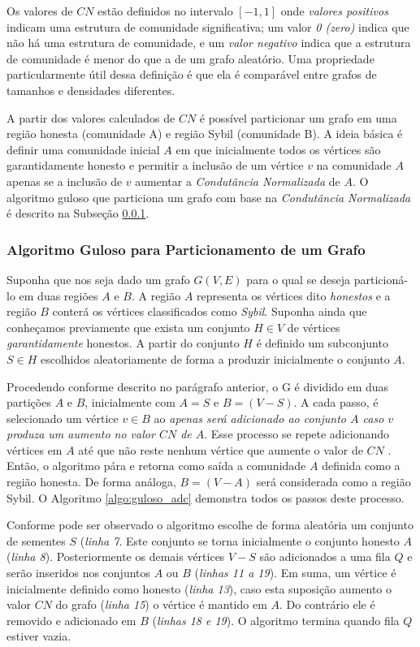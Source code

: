 \documentclass[12pt]{article}
\begin{document}
Os valores de $CN$ estão definidos no intervalo $[-1,1]$ onde \textit{valores positivos} indicam uma estrutura de comunidade significativa; um valor \textit{0 (zero)} indica que não há uma estrutura de comunidade, e um \textit{valor negativo} indica que a estrutura de comunidade é menor do que a de um
grafo aleatório. Uma propriedade particularmente útil dessa definição é que ela é comparável entre grafos de tamanhos e densidades diferentes.

A partir dos valores calculados de $CN$ é possível particionar um grafo em uma região honesta (comunidade A) e região Sybil (comunidade B). A ideia básica é definir uma comunidade inicial $A$ em que inicialmente todos os vértices são garantidamente honesto e permitir a inclusão de um vértice $v$ na comunidade $A$ apenas se a inclusão de $v$ aumentar a \textit{Condutância Normalizada} de $A$.  O algoritmo guloso que particiona um grafo com base na \textit{Condutância Normalizada} é descrito na Subseção \ref{subsubsec:algoritmo}.

\subsubsection{Algoritmo Guloso para Particionamento de um Grafo}
\label{subsubsec:algoritmo}

Suponha que nos seja dado um grafo $G(V,E)$ para o qual se deseja particioná-lo em duas regiões $A$ e $B$. A região $A$ representa os vértices dito \textit{honestos} e a região $B$ conterá os vértices classificados como \textit{Sybil}. Suponha ainda que conheçamos previamente que exista um conjunto $ H \in V$ de vértices \textit{garantidamente} honestos. A partir do conjunto $H$ é definido um subconjunto $S \in H$ escolhidos aleatoriamente de forma a produzir inicialmente o conjunto $A$. 


Procedendo conforme descrito no parágrafo anterior, o G é dividido em duas partições $A$ e $B$, inicialmente com $A = S$ e $B = (V-S)$. A cada passo, é selecionado um vértice $v \in B$ ao \textit{apenas será adicionado ao conjunto $A$ caso $v$ produza um aumento no valor $CN$ de $A$}. Esse processo se repete adicionando vértices em $A$ até que não reste nenhum vértice que aumente o valor de $CN$ . Então, o algoritmo pára e retorna como saída a comunidade $A$ definida como a região honesta. De forma análoga, $B = (V-A)$ será considerada como a região Sybil. O Algoritmo \ref{algo:guloso_adc} demonstra todos os passos deste processo.

Conforme pode ser observado o algoritmo escolhe de forma aleatória um conjunto de sementes $S$ (\textit{linha 7}. Este conjunto se torna inicialmente o conjunto honesto $A$ (\textit{linha 8}). Posteriormente os demais vértices $V-S$ são adicionados a uma fila $Q$ e serão inseridos nos conjuntos $A$ ou $B$ (\textit{linhas 11 a 19}). Em suma, um vértice é inicialmente definido como honesto (\textit{linha 13}), caso esta suposição aumento o valor $CN$ do grafo (\textit{linha 15}) o vértice é mantido em $A$. Do contrário ele é removido e adicionado em $B$ (\textit{linhas 18 e 19}). O algoritmo termina quando fila $Q$ estiver vazia.
\end{document}
